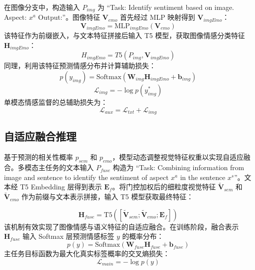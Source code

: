 在图像分支中，构造输入 $P_{img}$ 为 “Task: Identify sentiment based on image. Aspect: {$x^a$} Output:”。图像特征 $\mathbf{V}_{emo}$ 首先经过 MLP 映射得到 $\mathbf{V}_{imgEmo}$：
\begin{equation}
  \mathbf{V}_{imgEmo} = \text{MLP}_{imgEmo}(\mathbf{V}_{emo}) 
\end{equation}
该特征作为前缀嵌入，与文本特征拼接后输入 T5 模型，获取图像情感分类特征 $\mathbf{H}_{imgEmo}$：
\begin{equation}
H_{imgEmo}=T5(P_{img},\mathbf{V}_{imgEmo})
\end{equation}
同理，利用该特征预测情感分布并计算辅助损失：
\begin{equation}
    p(y_{img}) = \text{Softmax}(\mathbf{W}_{img} \mathbf{H}_{imgEmo} + \mathbf{b}_{img})
\end{equation}
\begin{equation}
    \mathcal{L}_{img} = - \log p(y_{img}^*)
\end{equation}
单模态情感监督的总辅助损失为：
\begin{equation}
    \mathcal{L}_{aux} = \mathcal{L}_{txt} + \mathcal{L}_{img}
\end{equation}

\subsection{自适应融合推理}
基于预测的相关性概率 $p_{sem}$ 和 $p_{emo}$，模型动态调整视觉特征权重以实现自适应融合。多模态主任务的文本输入 $P_{fuse}$ 构造为 “Task: Combining information from image and sentence to identify the sentiment of aspect {$x^a$} in the sentence {$x^s$}”。文本经 T5 Embedding 层得到表示 $\mathbf{E}_f$。将门控加权后的细粒度视觉特征 $\tilde{\mathbf{V}}_{sem}$ 和 $\tilde{\mathbf{V}}_{emo}$ 作为前缀与文本表示拼接，输入 T5 模型获取最终特征：

\begin{equation}
\mathbf{H}_{fuse} = \text{T5}([\tilde{\mathbf{V}}_{sem}; \tilde{\mathbf{V}}_{emo}; \mathbf{E}_{f}])
\end{equation}
该机制有效实现了图像情感与语义特征的自适应融合。在训练阶段，融合表示 $\mathbf{H}_{fuse}$ 输入 Softmax 层预测情感标签 $y$ 的概率分布：
\begin{equation}
    p(y) = \text{Softmax}(\mathbf{W}_{fuse} \mathbf{H}_{fuse} + \mathbf{b}_{fuse})
\end{equation}
主任务目标函数为最大化真实标签概率的交叉熵损失：
\begin{equation}
    \mathcal{L}_{main} = - \log p(y)
\end{equation}

